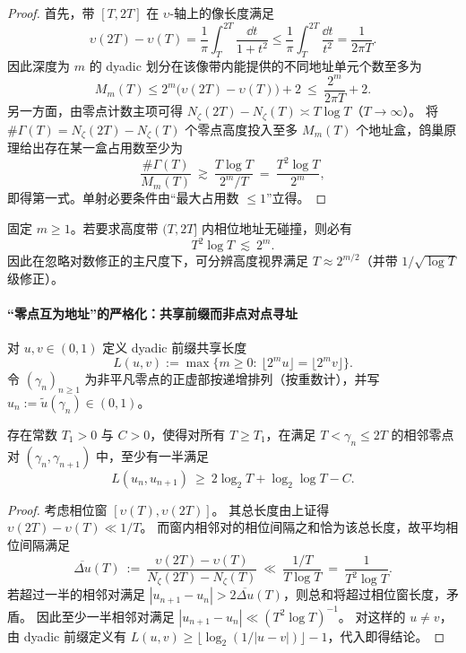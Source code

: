\begin{proof}
首先，带 \([T,2T]\) 在 \(\upsilon\)-轴上的像长度满足
\[
\upsilon(2T)-\upsilon(T)=\frac{1}{\pi}\int_T^{2T}\frac{\dd t}{1+t^2}
\le \frac{1}{\pi}\int_T^{2T}\frac{\dd t}{t^2}
=\frac{1}{2\pi T}.
\]
因此深度为 \(m\) 的 dyadic 划分在该像带内能提供的不同地址单元个数至多为
\[
M_m(T)\le 2^m\bigl(\upsilon(2T)-\upsilon(T)\bigr)+2\ \le\ \frac{2^m}{2\pi T}+2.
\]
另一方面，由零点计数主项可得 \(N_\zeta(2T)-N_\zeta(T)\asymp T\log T\)（\(T\to\infty\)）。
将 \(\#\Gamma(T)=N_\zeta(2T)-N_\zeta(T)\) 个零点高度投入至多 \(M_m(T)\) 个地址盒，鸽巢原理给出存在某一盒占用数至少为
\[
\frac{\#\Gamma(T)}{M_m(T)}\ \gtrsim\ \frac{T\log T}{2^m/T}\ =\ \frac{T^2\log T}{2^m},
\]
即得第一式。单射必要条件由“最大占用数 \(\le 1\)”立得。
\end{proof}

\begin{corollary}\label{cor:xi-phase-prefix-clarity-horizon}
固定 \(m\ge 1\)。若要求高度带 \((T,2T]\) 内相位地址无碰撞，则必有
\[
T^2\log T\ \lesssim\ 2^m.
\]
因此在忽略对数修正的主尺度下，可分辨高度视界满足 \(T\approx 2^{m/2}\)（并带 \(1/\sqrt{\log T}\) 级修正）。
\end{corollary}

\paragraph{“零点互为地址”的严格化：共享前缀而非点对点寻址}
对 \(u,v\in(0,1)\) 定义 dyadic 前缀共享长度
\[
L(u,v):=\max\{m\ge 0:\ \lfloor 2^m u\rfloor=\lfloor 2^m v\rfloor\}.
\]
令 \((\gamma_n)_{n\ge 1}\) 为非平凡零点的正虚部按递增排列（按重数计），并写 \(u_n:=\widetilde u(\gamma_n)\in(0,1)\)。

\begin{proposition}\label{prop:xi-phase-adjacent-prefix-sharing}
存在常数 \(T_1>0\) 与 \(C>0\)，使得对所有 \(T\ge T_1\)，在满足 \(T<\gamma_n\le 2T\) 的相邻零点对 \((\gamma_n,\gamma_{n+1})\) 中，至少有一半满足
\[
L(u_n,u_{n+1})\ \ge\ 2\log_2 T+\log_2\log T - C.
\]
\end{proposition}

\begin{proof}
考虑相位窗 \([\upsilon(T),\upsilon(2T)]\)。
其总长度由上证得 \(\upsilon(2T)-\upsilon(T)\ll 1/T\)。
而窗内相邻对的相位间隔之和恰为该总长度，故平均相位间隔满足
\[
\overline{\Delta u}(T)\ :=\ \frac{\upsilon(2T)-\upsilon(T)}{N_\zeta(2T)-N_\zeta(T)}\ \ll\ \frac{1/T}{T\log T}\ =\ \frac{1}{T^2\log T}.
\]
若超过一半的相邻对满足 \(|u_{n+1}-u_n|>2\overline{\Delta u}(T)\)，则总和将超过相位窗长度，矛盾。
因此至少一半相邻对满足 \(|u_{n+1}-u_n|\ll (T^2\log T)^{-1}\)。
对这样的 \(u\neq v\)，由 dyadic 前缀定义有 \(L(u,v)\ge \lfloor \log_2(1/|u-v|)\rfloor -1\)，代入即得结论。
\end{proof}

